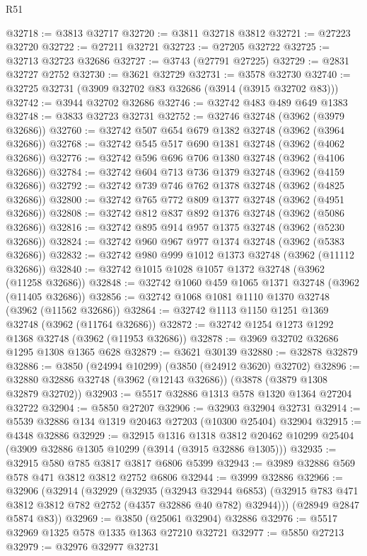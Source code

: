 \begin{lexlean}{R51}
\begin{coremodule}
@32718 := @3813 @32717
@32720 := @3811 @32718 @3812
@32721 := @27223 @32720
@32722 := @27211 @32721
@32723 := @27205 @32722
@32725 := @32713 @32723 @32686
@32727 := @3743 (@27791 @27225)
@32729 := @2831 @32727 @2752
@32730 := @3621 @32729
@32731 := @3578 @32730
@32740 := @32725 @32731 (@3909 @32702 @83 @32686 (@3914 (@3915 @32702 @83)))
@32742 := @3944 @32702 @32686
@32746 := @32742 @483 @489 @649 @1383
@32748 := @3833 @32723 @32731
@32752 := @32746 @32748 (@3962 (@3979 @32686))
@32760 := @32742 @507 @654 @679 @1382 @32748 (@3962 (@3964 @32686))
@32768 := @32742 @545 @517 @690 @1381 @32748 (@3962 (@4062 @32686))
@32776 := @32742 @596 @696 @706 @1380 @32748 (@3962 (@4106 @32686))
@32784 := @32742 @604 @713 @736 @1379 @32748 (@3962 (@4159 @32686))
@32792 := @32742 @739 @746 @762 @1378 @32748 (@3962 (@4825 @32686))
@32800 := @32742 @765 @772 @809 @1377 @32748 (@3962 (@4951 @32686))
@32808 := @32742 @812 @837 @892 @1376 @32748 (@3962 (@5086 @32686))
@32816 := @32742 @895 @914 @957 @1375 @32748 (@3962 (@5230 @32686))
@32824 := @32742 @960 @967 @977 @1374 @32748 (@3962 (@5383 @32686))
@32832 := @32742 @980 @999 @1012 @1373 @32748 (@3962 (@11112 @32686))
@32840 := @32742 @1015 @1028 @1057 @1372 @32748 (@3962 (@11258 @32686))
@32848 := @32742 @1060 @459 @1065 @1371 @32748 (@3962 (@11405 @32686))
@32856 := @32742 @1068 @1081 @1110 @1370 @32748 (@3962 (@11562 @32686))
@32864 := @32742 @1113 @1150 @1251 @1369 @32748 (@3962 (@11764 @32686))
@32872 := @32742 @1254 @1273 @1292 @1368 @32748 (@3962 (@11953 @32686))
@32878 := @3969 @32702 @32686 @1295 @1308 @1365 @628
@32879 := @3621 @30139
@32880 := @32878 @32879
@32886 := @3850 (@24994 @10299) (@3850 (@24912 @3620) @32702)
@32896 := @32880 @32886 @32748 (@3962 (@12143 @32686)) (@3878 (@3879 @1308 @32879 @32702))
@32903 := @5517 @32886 @1313 @578 @1320 @1364 @27204 @32722
@32904 := @5850 @27207
@32906 := @32903 @32904 @32731
@32914 := @5539 @32886 @134 @1319 @20463 @27203 (@10300 @25404) @32904
@32915 := @4348 @32886
@32929 := @32915
    @1316
    @1318
    @3812
    @20462
    @10299
    @25404
    (@3909 @32886 @1305 @10299 (@3914 (@3915 @32886 @1305)))
@32935 := @32915 @580 @785 @3817 @3817 @6806 @5399
@32943 := @3989 @32886 @569 @578 @471 @3812 @3812 @2752 @6806
@32944 := @3999 @32886
@32966 := @32906
    (@32914
      (@32929
        (@32935
          (@32943 @32944 @6853)
          (@32915 @783 @471 @3812 @3812 @782 @2752 (@4357 @32886 @40 @782) @32944)))
      (@28949 @2847 @5874 @83))
@32969 := @3850 (@25061 @32904) @32886
@32976 := @5517 @32969 @1325 @578 @1335 @1363 @27210 @32721
@32977 := @5850 @27213
@32979 := @32976 @32977 @32731

\end{coremodule}
\end{lexlean}
